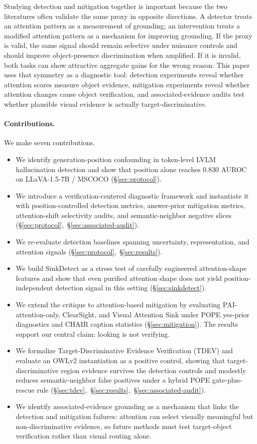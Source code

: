 Studying detection and mitigation together is important because the two literatures often validate the same proxy in opposite directions. A detector treats an attention pattern as a measurement of grounding; an intervention treats a modified attention pattern as a mechanism for improving grounding. If the proxy is valid, the same signal should remain selective under nuisance controls and should improve object-presence discrimination when amplified. If it is invalid, both tasks can show attractive aggregate gains for the wrong reason. This paper uses that symmetry as a diagnostic tool: detection experiments reveal whether attention scores measure object evidence, mitigation experiments reveal whether attention changes cause object verification, and associated-evidence audits test whether plausible visual evidence is actually target-discriminative.

\paragraph{Contributions.} We make seven contributions.
\begin{itemize}
\item We identify generation-position confounding in token-level LVLM hallucination detection and show that position alone reaches $0.830$ AUROC on LLaVA-1.5-7B / MSCOCO (\S\ref{sec:protocol}).
\item We introduce a verification-centered diagnostic framework and instantiate it with position-controlled detection metrics, answer-prior mitigation metrics, attention-shift selectivity audits, and semantic-neighbor negative slices (\S\ref{sec:protocol},~\S\ref{sec:associated-audit}).
\item We re-evaluate detection baselines spanning uncertainty, representation, and attention signals (\S\ref{sec:protocol},~\S\ref{sec:results}).
\item We build SinkDetect as a stress test of carefully engineered attention-shape features and show that even purified attention shape does not yield position-independent detection signal in this setting (\S\ref{sec:sinkdetect}).
\item We extend the critique to attention-based mitigation by evaluating PAI-attention-only, ClearSight, and Visual Attention Sink under POPE yes-prior diagnostics and CHAIR caption statistics (\S\ref{sec:mitigation}). The results support our central claim: looking is not verifying.
\item We formalize Target-Discriminative Evidence Verification (TDEV) and evaluate an OWLv2 instantiation as a positive control, showing that target-discriminative region evidence survives the detection controls and modestly reduces semantic-neighbor false positives under a hybrid POPE gate-plus-rescue rule (\S\ref{sec:tdev},~\S\ref{sec:results},~\S\ref{sec:associated-audit}).
\item We identify associated-evidence grounding as a mechanism that links the detection and mitigation failures: attention can select visually meaningful but non-discriminative evidence, so future methods must test target-object verification rather than visual routing alone.
\end{itemize}
